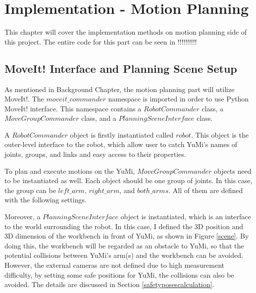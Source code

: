 \chapter{Implementation - Motion Planning}

This chapter will cover the implementation methods on motion planning side of this project. The entire code for this part can be seen in !!!!!!!!!!

\section{MoveIt! Interface and Planning Scene Setup} \label{motionplansetup}
As mentioned in Background Chapter, the motion planning part will utilize MoveIt!. The $moveit\_commander$ namespace is imported in order to use Python MoveIt! interface. This namespace contains a $RobotCommander$ class, a $MoveGroupCommander$ class, and a $PlanningSceneInterface$ class.

A $RobotCommander$ object is firstly instantiated called $robot$. This object is the outer-level interface to the robot, which allow user to catch YuMi's names of joints, groups, and links and easy access to their properties.

To plan and execute motions on the YuMi, $MoveGroupCommander$ objects need to be instantiated as well. Each object should be one group of joints. In this case, the group can be $left\_arm$, $right\_arm$, and $both\_arms$. All of them are defined with the following settings.

\begin{table}[H]
\centering
{}
\caption{Settings of three $MoveGroupCommander$ objects}
\label{armsetup}
\end{table}

Moreover, a $PlanningSceneInterface$ object is instantiated, which is an interface to the world surrounding the robot. In this case, I defined the 3D position and 3D dimension of the workbench in front of YuMi, as shown in Figure \ref{scene}. By doing this, the workbench will be regarded as an obstacle to YuMi, so that the potential collisions between YuMi's arm(s) and the workbench can be avoided. However, the external cameras are not defined due to high measurement difficulty, by setting some safe positions for YuMi, the collisions can also be avoided. The details are discussed in Section \ref{safetyposescalculation}.

